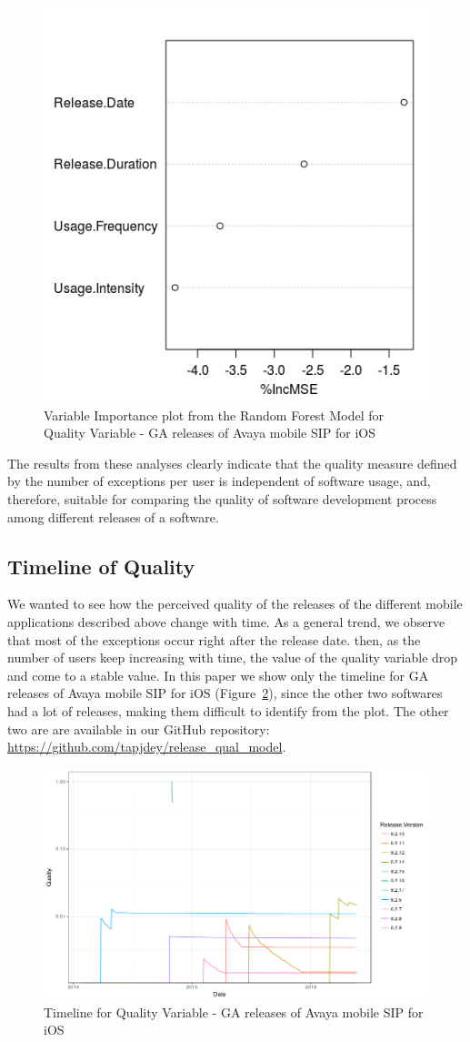 \documentclass[smallextended]{svjour3}       %
\begin{document}
\begin{figure}[!t]
\centering
\includegraphics[width=0.4\linewidth]{rfqI}
\caption{Variable Importance plot from the Random Forest  Model for Quality Variable - GA releases of Avaya mobile SIP for iOS}
\label{fig:rf2I}
\vspace{-15pt}
\end{figure}

The results from these analyses clearly indicate that the quality measure defined by the number of exceptions per user is independent of software usage, and, therefore, suitable for comparing the quality of software development process among different releases of a software.

\subsection{Timeline of Quality}
We wanted to see how the perceived quality of the releases of the different mobile applications described above change with time. As a general trend, we observe that most of the exceptions occur right after the release date. then, as the number of users keep increasing with time, the value of the quality variable drop and come to a stable value.  In this paper we show only the timeline for GA releases of Avaya mobile SIP for iOS (Figure~\ref{fig:tI}), since the other two softwares had a lot of releases, making them difficult to identify from the plot. The other two are  are available in our GitHub repository:\\ \url{https://github.com/tapjdey/release\_qual\_model}.

\begin{figure}[!t]
\centering
\includegraphics[width=\linewidth]{timeline_I}
\caption{Timeline for Quality Variable - GA releases of Avaya mobile SIP for iOS}
\label{fig:tI}
\vspace{-10pt}
\end{figure}
\end{document}
